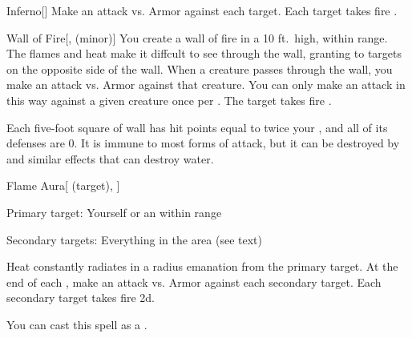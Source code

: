 \lowercase{\hypertarget{spell:Inferno}{}}\label{spell:Inferno}
\begin{freeability}[\nth{3}]{\hypertarget{spell:Inferno}{Inferno}}[]
Make an attack vs. Armor against each target.
\hit Each target takes fire .
\end{freeability}
\vspace{0.25em}



\lowercase{\hypertarget{spell:Wall of Fire}{}}\label{spell:Wall of Fire}
\begin{freeability}[\nth{3}]{\hypertarget{spell:Wall of Fire}{Wall of Fire}}[,  (minor)]
You create a wall of fire in a 10 ft.\ high, \arealarge {} within \rngmed range.
The flames and heat make it diffcult to see through the wall, granting  to targets on the opposite side of the wall.
When a creature passes through the wall, you make an attack vs. Armor against that creature.
You can only make an attack in this way against a given creature once per .
\hit The target takes fire .

Each five-foot square of wall has hit points equal to twice your , and all of its defenses are 0.
It is immune to most forms of attack, but it can be destroyed by  and similar effects that can destroy water.
\end{freeability}
\vspace{0.25em}



\lowercase{\hypertarget{spell:Flame Aura}{}}\label{spell:Flame Aura}
\begin{attuneability}[\nth{4}]{\hypertarget{spell:Flame Aura}{Flame Aura}}[ (target), ]

Primary target: Yourself or an  within \rngclose range
\par\noindent
Secondary targets: Everything in the area (see text)

Heat constantly radiates in a \areasmall radius emanation from the primary target.
At the end of each , make an attack vs. Armor against each secondary target.
\hit Each secondary target takes fire  \minus2d.

You can cast this spell as a .
\end{attuneability}
\vspace{0.25em}



